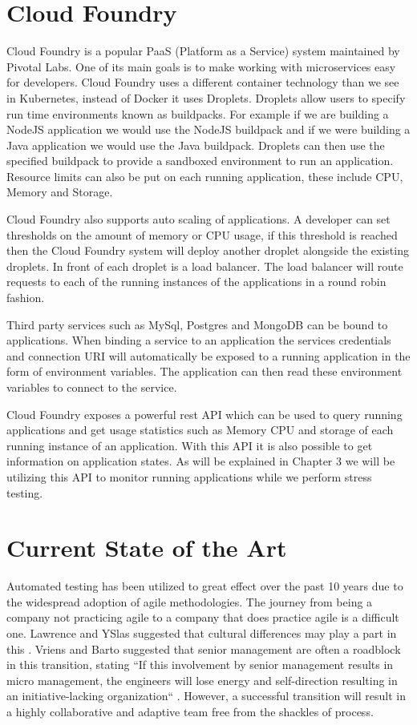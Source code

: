 \section{Cloud Foundry}

Cloud Foundry is a popular PaaS (Platform as a Service) system maintained by Pivotal Labs. One of its main goals is to make working with microservices easy for developers. Cloud Foundry uses a different container technology than we see in Kubernetes, instead of Docker it uses Droplets. Droplets allow users to specify run time environments known as buildpacks. For example if we are building a NodeJS application we would use the NodeJS buildpack and if we were building a Java application we would use the Java buildpack. Droplets can then use the specified buildpack to provide a sandboxed environment to run an application. Resource limits can also be put on each running application, these include CPU, Memory and Storage.

Cloud Foundry also supports auto scaling of applications. A developer can set thresholds on the amount of memory or CPU usage, if this threshold is reached then the Cloud Foundry system will deploy another droplet alongside the existing droplets. In front of each droplet is a load balancer. The load balancer will route requests to each of the running instances of the applications in a round robin fashion.

Third party services such as MySql, Postgres and MongoDB can be bound to applications. When binding a service to an application the services credentials and connection URI will automatically be exposed to a running application in the form of environment variables. The application can then read these environment variables to connect to the service.

Cloud Foundry exposes a powerful rest API which can be used to query running applications and get usage statistics such as Memory CPU and storage of each running instance of an application. With this API it is also possible to get information on application states. As will be explained in Chapter 3 we will be utilizing this API to monitor running applications while we perform stress testing.

\section{Current State of the Art}

Automated testing has been utilized to great effect over the past 10 years due to the widespread adoption of agile methodologies. The journey from being a company not practicing agile to a company that does practice agile is a difficult one. Lawrence and YSlas suggested that cultural differences may play a part in this \cite{1667587}. Vriens and Barto suggested that senior management are often a roadblock in this transition, stating ``If this involvement by senior management results in micro management, the engineers will lose energy and self-direction resulting in an initiative-lacking organization`` \cite{4599511}. However, a successful transition will result in a highly collaborative and adaptive team free from the shackles of process.

